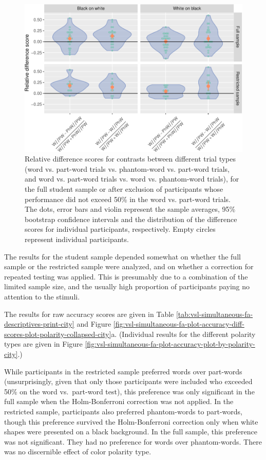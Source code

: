 \documentclass[
]{article}
\begin{document}
\begin{figure}

{\centering \includegraphics[width=0.8\linewidth]{vsl_phamtoms_simultaneous_results_files/figure-latex/vsl-simultaneous-fa-plot-difference-scores-plot-by-polarity-city-1} 

}

\caption{Relative difference scores for contrasts between different trial types (word vs. part-word trials vs. phantom-word vs. part-word trials, and word vs. part-word trials vs. word vs. phantom-word trials), for the full student sample or after exclusion of participants whose performance did not exceed 50\% in the word vs. part-word trials. The dots, error bars and violin represent the sample averages, 95\% bootstrap confidence intervals and the distribution of the difference scores for individual participants, respectively. Empty circles represent individual participants.}\label{fig:vsl-simultaneous-fa-plot-difference-scores-plot-by-polarity-city}
\end{figure}

The results for the student sample depended somewhat on whether the full
sample or the restricted sample were analyzed, and on whether a
correction for repeated testing was applied. This is presumably due to a
combination of the limited sample size, and the usually high proportion
of participants paying no attention to the stimuli.

The results for raw accuracy scores are given in Table
\ref{tab:vsl-simultaneous-fa-descriptives-print-city} and Figure
\ref{fig:vsl-simultaneous-fa-plot-accuracy-diff-scores-plot-polarity-collapsed-city}a.
(Individual results for the different polarity types are given in Figure
\ref{fig:vsl-simultaneous-fa-plot-accuracy-plot-by-polarity-city}.)

While participants in the restricted sample preferred words over
part-words (unsurprisingly, given that only those participants were
included who exceeded 50\% on the word vs.~part-word test), this
preference was only significant in the full sample when the
Holm-Bonferroni correction was not applied. In the restricted sample,
participants also preferred phantom-words to part-words, though this
preference survived the Holm-Bonferroni correction only when white
shapes were presented on a black background. In the full sample, this
preference was not significant. They had no preference for words over
phantom-words. There was no discernible effect of color polarity type.
\end{document}
